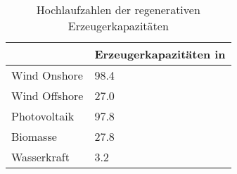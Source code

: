 {
\renewcommand{\arraystretch}{1.2}%
\begin{table}[H]
	\begin{center}
		\caption{Hochlaufzahlen der regenerativen Erzeugerkapazitäten}
		\begin{tabu} to 0.7\textwidth {X[1] X[1, r]}
			\hline
			              & Erzeugerkapazitäten in \si{\gw} \\ \hline
			Wind Onshore  & \num{98.4}                      \\
			Wind Offshore & \num{27.0}                      \\
			Photovoltaik  & \num{97.8}                      \\
			Biomasse      & \num{27.8}                      \\
			Wasserkraft   & \num{3.2}                       \\ \hline
		\end{tabu}
		\label{tab:EE-RampUp}
	\end{center}
	\vspace{-3mm}%
\end{table}
}